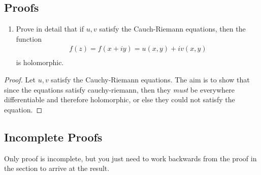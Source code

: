 \subsection{Proofs}
\begin{enumerate}
	\item Prove in detail that if $u, v$ satisfy the Cauch-Riemann equations, then the function
	\begin{align*}
		f(z) = f(x + iy) = u(x, y) + iv(x, y) \\
	\end{align*}
	is holomorphic.
\end{enumerate}
\begin{proof}
	Let $u,v$ satisfy the Cauchy-Riemann equations. The aim is to show that since the equations satisfy cauchy-riemann,
	then they \emph{must} be everywhere differentiable and therefore holomorphic, or else they could not satisfy the equation.
\end{proof}

\subsection{Incomplete Proofs}
Only proof is incomplete, but you just need to work backwards from the proof in the section to arrive at the result.
\newpage
